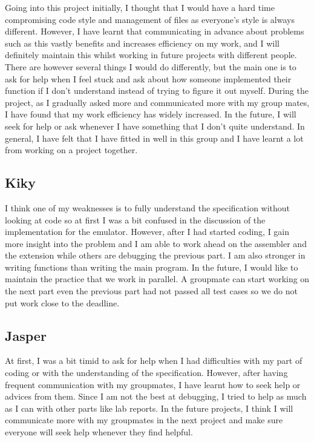 \documentclass[11pt]{article}
\begin{document}
Going into this project initially, I thought that I would have a hard time compromising code style and management of files as everyone’s style is always different. However, I have learnt that communicating in advance about problems such as this vastly benefits and increases efficiency on my work, and I will definitely maintain this whilst working in future projects with different people. There are however several things I would do differently, but the main one is to ask for help when I feel stuck and ask about how someone implemented their function if I don’t understand instead of trying to figure it out myself. During the project, as I gradually asked more and communicated more with my group mates, I have found that my work efficiency has widely increased. In the future, I will seek for help or ask whenever I have something that I don’t quite understand. In general, I have felt that I have fitted in well in this group and I have learnt a lot from working on a project together.

\subsection{Kiky}

I think one of my weaknesses is to fully understand the specification without looking at code so at first I was a bit confused in the discussion of the implementation for the emulator. However, after I had started coding, I gain more insight into the problem and I am able to work ahead on the assembler and the extension while others are debugging the previous part. I am also stronger in writing functions than writing the main program. In the future, I would like to maintain the practice that we work in parallel. A groupmate can start working on the next part even the previous part had not passed all test cases so we do not put work close to the deadline.

\subsection{Jasper}

At first, I was a bit timid to ask for help when I had difficulties with my part of coding or with the understanding of the specification. However, after having frequent communication with my groupmates, I have learnt how to seek help or advices from them. Since I am not the best at debugging, I tried to help as much as I can with other parts like lab reports. In the future projects, I think I will communicate more with my groupmates in the next project and make sure everyone will seek help whenever they find helpful.
\end{document}
